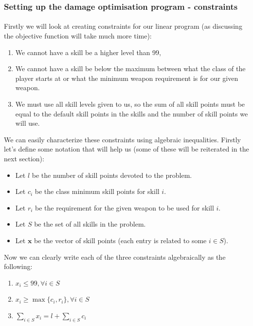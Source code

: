 \documentclass{article}
\begin{document}
\subsubsection{Setting up the damage optimisation program - constraints}
\paragraph{}Firstly we will look at creating constraints for our linear program (as discussing the objective function will take much more time):
\begin{enumerate}
    \item We cannot have a skill be a higher level than 99,
    \item We cannot have a skill be below the maximum between what the class of the player starts at or what the minimum weapon requirement is for our given weapon.
    \item We must use all skill levels given to us, so the sum of all skill points must be equal to the default skill points in the skills and the number of skill points we will use.
\end{enumerate}
\par We can easily characterize these constraints using algebraic inequalities. Firstly let's define some notation that will help us (some of these will be reiterated in the next section):
\begin{itemize}
    \item Let $l$ be the number of skill points devoted to the problem.
    \item Let $c_i$ be the class minimum skill points for skill $i$.
    \item Let $r_i$ be the requirement for the given weapon to be used for skill $i$.
    \item Let $S$ be the set of all skills in the problem.
    \item Let $\boldsymbol{x}$ be the vector of skill points (each entry is related to some $i \in S$).
\end{itemize}
\par Now we can clearly write each of the three constraints algebraically as the following:
\begin{enumerate}
    \item $x_i \leq 99, \forall i \in S$
    \item $x_i \geq \max\{c_i, r_i\}, \forall i \in S$
    \item $\sum_{i \in S}x_i =  l+ \sum_{i \in S} c_i$
\end{enumerate}
\end{document}
